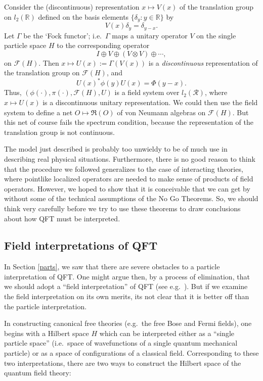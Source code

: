 \documentclass[12pt]{article}
\theoremstyle{definition}
\theoremstyle{definition}
\theoremstyle{remark}
\def\2#1{{\mathcal #1}}
\def\al#1{{\mathfrak #1}}
\begin{document}
Consider the (discontinuous) representation $x\mapsto
V(x)$ of the translation group on $l_2(\mathbb{R})$
defined on the basis elements $\{ \delta _y:y\in
\mathbb{R}\}$ by
\begin{equation}
  V(x)\delta _{y} =\delta _{y-x} .\end{equation}
Let $\Gamma$ be the `Fock functor'; i.e.\ $\Gamma$ maps
a unitary operator $V$ on the single particle
space $H$ to the corresponding operator 
\[ I\oplus V\oplus (V\otimes V)\oplus \cdots , \] on
$\2F (H)$.  Then $x\mapsto U(x):=\Gamma (V(x))$ is a
\emph{discontinuous} representation of the translation
group on $\2F (H)$, and
\begin{equation}
  U(x)^*\phi (y)U(x)=\Phi (y-x) .\end{equation}
Thus, $(\phi (\cdot ),\pi (\cdot ),\2F (H),U)$ is a
field system over $l_2(\2R )$,
where $x\mapsto U(x)$ is a discontinuous unitary representation.  We could then use
the field system to define a net $O\mapsto \al R(O)$ of von Neumann algebras on $\2F
(H)$.  But this net of course fails the spectrum condition, because the
representation of the translation group is not continuous.    

The model just described is probably too unwieldy to be
of much use in describing real physical situations.
Furthermore, there is no good reason to think that the
procedure we followed generalizes to the case of
interacting theories, where pointlike localized
operators are needed to make sense of products of field
operators.  However, we hoped to show that it is
conceivable that we can get by without some of the
technical assumptions of the No Go Theorems.  So, we
should think very carefully before we try to use these
theorems to draw conclusions about how QFT must be
interpreted.




\subsection{Field interpretations of QFT}

In Section \ref{parts}, we saw that there are severe obstacles to a
particle interpretation of QFT.  One might argue then, by a process of
elimination, that we should adopt a ``field interpretation'' of QFT
(see e.g.\ \cite{tell,nhug}).  But if we examine the field
interpretation on its own merits, its not clear that it is better off
than the particle interpretation.  

In constructing canonical free theories (e.g.\ the free Bose and Fermi
fields), one begins with a Hilbert space $H$ which can be interpreted
either as a ``single particle space'' (i.e.\ space of wavefunctions of
a single quantum mechanical particle) or as a space of configurations
of a classical field.  Corresponding to these two interpretations,
there are two ways to construct the Hilbert space of the quantum field
theory:
\end{document}
